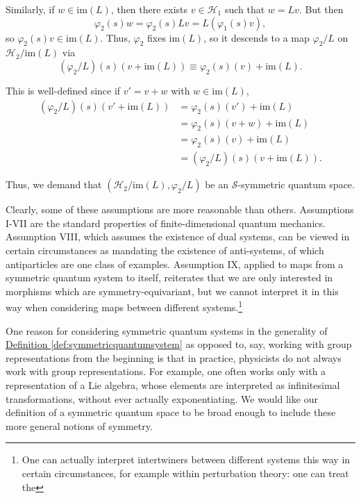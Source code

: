 \documentclass[a4paper,10pt]{scrreprt}
\newcommand{\im}{\mathrm{im}}
\theoremstyle{definition}
\theoremstyle{plain}
\theoremstyle{remark}
\begin{document}
\begin{enumerate}[label=\Roman*.]
    Similarly, if $w \in \im(L)$, then there exists $v \in \mathscr{H}_{1}$ such that $w = Lv$. But then 
    \begin{equation*}
      \varphi_{2}(s)w = \varphi_{2}(s) Lv = L(\varphi_{1}(s) v),
    \end{equation*}
    so $\varphi_{2}(s) v \in \im(L)$. Thus, $\varphi_{2}$ fixes $\im(L)$, so it descends to a map $\varphi_{2}/L$ on $\mathscr{H}_{2}/\im(L)$ via
    \begin{equation*}
      (\varphi_{2}/L)(s)\left( v + \im(L) \right) \equiv \varphi_{2}(s)(v) + \im(L).
    \end{equation*}

    This is well-defined since if $v' = v + w$ with $w \in \im(L)$, 
    \begin{align*}
      (\varphi_{2}/L)(s)\left( v' + \im(L) \right) &= \varphi_{2}(s)(v') + \im(L) \\
      &= \varphi_{2}(s)(v + w) + \im(L) \\
      &= \varphi_{2}(s)(v) + \im(L) \\
      &= (\varphi_{2}/L)(s)\left( v + \im(L) \right).
    \end{align*}

    Thus, we demand that $(\mathscr{H}_{2}/\im(L), \varphi_{2}/L)$ be an $\mathcal{S}$-symmetric quantum space.
\end{enumerate}

Clearly, some of these assumptions are more reasonable than others. Assumptions I-VII are the standard properties of finite-dimensional quantum mechanics. Assumption VIII, which assumes the existence of dual systems, can be viewed in certain circumstances as mandating the existence of anti-systems, of which antiparticles are one class of examples. Assumption IX, applied to maps from a symmetric quantum system to itself, reiterates that we are only interested in morphisms which are symmetry-equivariant, but we cannot interpret it in this way when considering maps between different systems.\footnote{One can actually interpret intertwiners between different systems this way in certain circumstances, for example within perturbation theory: one can treat the }

One reason for considering symmetric quantum systems in the generality of \hyperref[def:symmetricquantumsystem]{Definition \ref*{def:symmetricquantumsystem}} as opposed to, say, working with group representations from the beginning is that in practice, physicists do not always work with group representations. For example, one often works only with a representation of a Lie algebra, whose elements are interpreted as infinitesimal transformations, without ever actually exponentiating. We would like our definition of a symmetric quantum space to be broad enough to include these more general notions of symmetry.
\end{document}

